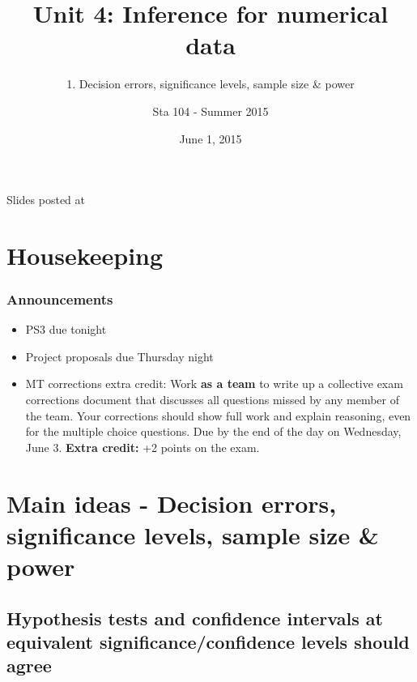 \documentclass[slidestop,compress,mathserif,12pt,t,professionalfonts,xcolor=table]{beamer}
\title{Unit 4: Inference for numerical data}
\subtitle{1. Decision errors, significance levels, sample size \& power}
\author{Sta 104 - Summer 2015}
\date{June 1, 2015}
\institute{Duke University, Department of Statistical Science}
\begin{document}



\begin{frame}[plain]

\titlepage
\vfill
{\scriptsize {} \hfill Slides posted at  \webLink{\CourseSite}{\CourseSite}}
\addtocounter{framenumber}{-1} 

\end{frame}


\section{Housekeeping}


\begin{frame}
\frametitle{Announcements}

\begin{itemize}

\item PS3 due tonight

\item Project proposals due Thursday night

\item MT corrections extra credit: Work \textbf{as a team} to write up a collective exam corrections document that discusses all questions missed by any member of the team. Your corrections should show full work and explain reasoning, even for the multiple choice questions. Due by the end of the day on Wednesday, June 3. \textbf{Extra credit:} +2 points on the exam.

\end{itemize}

\end{frame}


\section{Main ideas - Decision errors, significance levels, sample size \& power}


\subsection{Hypothesis tests and confidence intervals at equivalent significance/confidence levels should agree}
\label{mi1dec}
\end{document}
